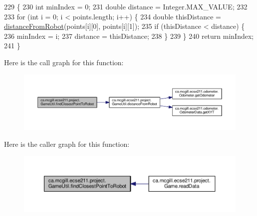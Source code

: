 \begin{DoxyCode}
229                                                             \{
230     \textcolor{keywordtype}{int} minIndex = 0;
231     \textcolor{keywordtype}{double} distance = Integer.MAX\_VALUE;
232 
233     \textcolor{keywordflow}{for} (\textcolor{keywordtype}{int} i = 0; i < points.length; i++) \{
234       \textcolor{keywordtype}{double} thisDistance = \hyperlink{classca_1_1mcgill_1_1ecse211_1_1project_1_1_game_util_ae373ebc3ec91ed3bf9dd7304a482a3f5}{distanceFromRobot}(points[i][0], points[i][1]);
235       \textcolor{keywordflow}{if} (thisDistance < distance) \{
236         minIndex = i;
237         distance = thisDistance;
238       \}
239     \}
240     \textcolor{keywordflow}{return} minIndex;
241   \}
\end{DoxyCode}
Here is the call graph for this function\+:\nopagebreak
\begin{figure}[H]
\begin{center}
\leavevmode
\includegraphics[width=350pt]{classca_1_1mcgill_1_1ecse211_1_1project_1_1_game_util_a6e0ee94b800ca3727ca8009782abda14_cgraph}
\end{center}
\end{figure}
Here is the caller graph for this function\+:\nopagebreak
\begin{figure}[H]
\begin{center}
\leavevmode
\includegraphics[width=350pt]{classca_1_1mcgill_1_1ecse211_1_1project_1_1_game_util_a6e0ee94b800ca3727ca8009782abda14_icgraph}
\end{center}
\end{figure}
\mbox{\label{classca_1_1mcgill_1_1ecse211_1_1project_1_1_game_util_aa9819819c4de2ef025caac87d0c0b0db}} 
